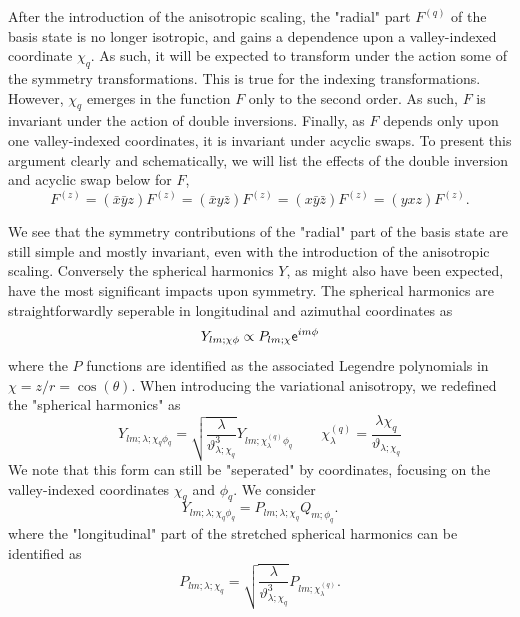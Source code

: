 After the introduction of the anisotropic scaling, the "radial" part
$F^{\left(q\right)}$ of the basis state is no longer isotropic, and gains a
dependence upon a valley-indexed coordinate $\chi_{q}$. As such, it will be
expected to transform under the action some of the symmetry transformations.
This is true for the indexing transformations. However, $\chi_{q}$ emerges in
the function $F$ only to the second order. As such, $F$ is invariant under the
action of double inversions. Finally, as $F$ depends only upon one
valley-indexed coordinates, it is invariant under acyclic swaps. To present this
argument clearly and schematically, we will list the effects of the double
inversion and acyclic swap below for $F$,
\begin{equation}
  F^{\left(z\right)}
  =
    \left(\bar{x}\bar{y}z\right)F^{\left(z\right)}
  =
    \left(\bar{x}y\bar{z}\right)F^{\left(z\right)}
  =
    \left(x\bar{y}\bar{z}\right)F^{\left(z\right)}
  =
    \left(yxz\right)F^{\left(z\right)}.
\end{equation}

We see that the symmetry contributions of the "radial" part of the basis state
are still simple and mostly invariant, even with the introduction of the
anisotropic scaling. Conversely the spherical harmonics $Y$, as might also have
been expected, have the most significant impacts upon symmetry. The spherical
harmonics are straightforwardly seperable in longitudinal and azimuthal
coordinates as
\begin{equation}
  Y_{lm;\chi\phi}
  \propto
  P_{lm;\chi}
  \mathsf{e}^{i m \phi}
\end{equation}
where the $P$ functions are identified as the associated Legendre polynomials in
$\chi = z/r = \cos\left(\theta\right)$. When introducing the variational
anisotropy, we redefined the "spherical harmonics" as
\begin{equation}
Y_{lm;\lambda;\chi_{q}\phi_{q}}
=
\sqrt{ \frac{\lambda}{\vartheta_{\lambda;\chi_{q}}^{3}} }
Y_{
  lm;
  \chi_{\lambda}^{\left(q\right)}
  \phi_{q}
}
\quad\quad
\chi_{\lambda}^{\left(q\right)}
=
\frac{\lambda\chi_{q}}{\vartheta_{\lambda;\chi_{q}}}
\end{equation}
We note that this form can still be "seperated" by coordinates, focusing on the
valley-indexed coordinates $\chi_{q}$ and $\phi_{q}$. We consider
\begin{equation}
  Y_{lm;\lambda;\chi_{q}\phi_{q}}
  =
  P_{lm;\lambda;\chi_{q}}
  Q_{m;\phi_{q}}.
\end{equation}
where the "longitudinal" part of the stretched spherical harmonics can be
identified as
\begin{equation}
  P_{lm;\lambda;\chi_{q}}
  =
  \sqrt{ \frac{\lambda}{\vartheta_{\lambda;\chi_{q}}^{3}} }
  P_{lm;\chi_{\lambda}^{\left(q\right)}}.
  \label{scaled_wf:long_part}
\end{equation}



